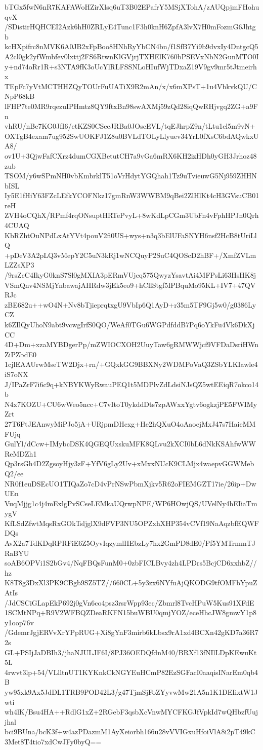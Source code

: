 bTGx5fwN6nR7KAFAWoHZirXlsq6uT3B02EPafrY5MSjXTohA/zAUQpjmFHohuqvX
/SDistirHQHCEI2Azk6hH0ZRLyE4Tunc1F3h0knH6ZpfA3lvX7H0mFozmG6Jhtgb
kcHXpifrc8nMVK6A0JB2xFpBoo8HNhRyYbCN4bn/f1SfB7Yi9b9dvxIy4DntgcQ5
A2cl0gk2yfWmbfev0lxttj2FS6RtwnKlGVjrjTXHElK760bPSEVxNbN2GunMTO0I
y+nd74oRr1R+s3NTA9fK3oUcYlRLFSSNLoHIufWjTDxaZ19V9gv9mr5tJtmeirhx
TEpFc7yVtMCTHHZQyTOUrFuUATiX9R2mAn/x/x6mXPsT+1u4VbkvkQU/CNpP68kB
lFHP7te0MR9rqezuIPHmtz8QY9ftxBn98swAXMj59zQd28iqQwRHjvgq2ZG+a9Fn
vhRU/nBe7KG0JfI6/etKZS0CSeeJRBa0JOscEVL/tqEJhrpZ9n/tLtu1el5m9vN+
OXTgB4exam7ug952SwUOKFJ1Z8u0BVLdTOLyLlyuev34YrL0fXsC6bdAQwkxUA8/
ov1U+3QjwFafCXrz4dumCGXBetutCH7a9vGa6mRX6KH2izHDh0yGH3Jrhoz48zub
TSOM/y6wSPmNH0vbKmbrklT51oVrHdytYGQhah1Tz9uTvieuwG5Nj959ZHHNbISL
Iy5E1fHiY63FZcLEfkYCOFNkz17gmRnW3WWBM9qBei2ZlHlKt4cH3GVsuCB01reH
ZVH4oCQhX/RPmf4rqONsuptHRTePvyL+8wKdLpCGm3UbFn4vFphHPJn0Qrh4CUAQ
KbRZhtOuNPdLxAtYVt4pouV2fi0US+wys+n3q3bElUFaSNYH6nsf2HcB8tUriLlQ
+pDeV3A2pLQ3vMepY2C5uN3kRj1wNCQuyP2SuC4QOScD2hBF+/XmfZVLmLZZsXP3
/9rsZcC4IkyG0knS7Sl0gMXIA3pERmVUjeq575QwyzYsavtAi4MFPsLi63HsHK8j
VSmQnv4NSMjYnbawajAHRdw3jEk5eo9+hCllStgf5IPBquMo95KL+IV7+47QVRJc
zBE682u++wO4N+Nv8bTjieprqtxgU9VbIp6Q1AyD+r35m5TF9Gj5w0/g0386LyCZ
k6ZIlQyUhoN9abt9vcwgIrfS0QO/WeAf0TGu6WGPdfddB7Pq6oYkFu4Vk6DkXjCC
4D+Dm+xzaMYBDgerPp/mZWIOCXOH2UuyTaw6gRMWWjcf9VFDaDsriHWnZiPZbdE0
1cjlEAAUrwMseTW2Djx+rn/+GQxkGG9BBXNy2WDMPoVaQ3ZSbYLKIawle4iS7oNX
J/IPaZrF7i6c9q+kNBYKWyRwauPEQ1t5MDPlvZdLdsiNJsQZ5wtEEiqR7okco14b
N4x7KOZU+CU6wWeo5ncc+C7vItoT0ykddDts7zpAWxxYgtv6ogkzjPE5FWIMyZrt
27T6FtJEAnwyMiPJo5jA+URjpmDHcxg+He2hQXuO4oAaoejMxJ47s7HaieMMFUjq
GulYl/dCcw+IMybcDSK4QGEQUxskuMFK8QLvu2kXCI0bL6dNkKSAhfwWWReMDZh1
Qp3rsGh4D2ZgsoyHjy3zF+YfV6gLy2Uv+xMxxNUcK9CLMjx4waepvGGWMebQ2/ee
NR0f1euDSEcUO1TIQaZo7cD4vPrNSwPbmXjkv5R62oFIEMGZT17ie/26ip+DwUEn
VuqMjjg1c4j4mExlgPvSCseLEMkaUQrwpNPE/WP6HOwjQS/UVelNy4hEIiaTmygV
KfLSdZfwtMqsRxGOkTsljglX9dFVP3NU5OPZxhXHP354vCVf19NaAqzbfEQWFDQs
AvX2a7TdKDqRPRFiE6Z5OyvIqzymlHEbzLy7hx2GmPD8dE0/Pf5YMTrmmTJRaBYU
soAB6OPVi1S2bGv4/NqFBQsFunM0+0zbFICLBvy4zh4LPDrs5BcjCD6xxhbZ//hz
K8T8g3DxXl3PK9CBgb9SZ5TZ//660CL+5y3zx6NYfuAjQKODG9tfOMFbYpuZAtIs
/JdCSCiGLapEkP692j0gVn6co4psz3rsrWpp93ec/Zbmrl8TvcHPuW5Kus91XFdE
1SCMtNPq+R9V2WFBQZDeaRKFN15buWBU0qmjYOZ/eceHhcJW8gmwY1p8y1oop76v
/GdemrJgjERVvXrYPpRUG+Xi8gYnF3mirb6kLbsx9rA1xd4BCXn42gKD7a36R72s
GL+PSIjJaDBIh3/jhaNJULJF6I/8PJ36OEDQfdnM40/BRXf13fNIlLDpKEwuKt5L
4rwvt3lp+54/VLlltnUT1KYKnkCkNGYEuHCmP82EzSGFacI0aaqisINarEm0qb4B
yw95xk9Ax5JdDL1TRB9POD42L3/g47TjmSjFoZYyvwMw21A5n1K1DEIixtW1Jwti
wh4lK/Bsu4HA++RdlG1xZ+2RGebF3qsbXcVnwMYCFKGJfVpkId7wQHbzfUujjhal
bci9BUna/bcK3f+w4azPDazmM1AyXeiorbh166u28vVVIGxuHfoiVlA8i2pT49kC
3Met8T4tio7xdCwJFy0byQ==
